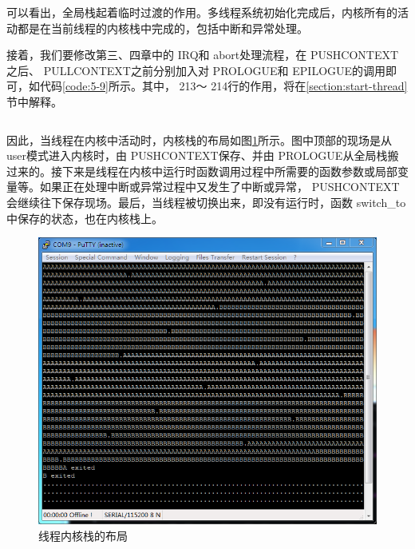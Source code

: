 \documentclass[main.tex]{subfiles}
\begin{document}
\begin{CJK*}{UTF8}{song}
\begin{code}
\label{code:5-8}
\inputminted[firstline=99,lastline=122,linenos,numbersep=5pt,frame=lines,framesep=2mm]{gas}{src/chapter05/kernel/entry.S}
\end{code}

\par
可以看出，全局栈起着临时过渡的作用。多线程系统初始化完成后，内核所有的活动都是在当前线程的内核栈中完成的，包括中断和异常处理。

\par
接着，我们要修改第三、四章中的 IRQ和 abort处理流程，在 PUSH\-CONTEXT之后、  PULL\-CONTEXT之前分别加入对 PRO\-LOGUE和 EPI\-LOGUE的调用即可，如代码\ref{code:5-9}所示。其中， 213～ 214行的作用，将在\ref{section:start-thread}节中解释。

\begin{code}
\label{code:5-9}
\inputminted[firstline=201,lastline=243,linenos,numbersep=5pt,frame=lines,framesep=2mm]{gas}{src/chapter05/kernel/entry.S}
\end{code}

因此，当线程在内核中活动时，内核栈的布局如图\ref{figure:5-2}所示。图中顶部的现场是从user模式进入内核时，由 PUSH\-CONTEXT保存、并由 PRO\-LOGUE从全局栈搬过来的。接下来是线程在内核中运行时函数调用过程中所需要的函数参数或局部变量等。如果正在处理中断或异常过程中又发生了中断或异常， PUSH\-CONTEXT会继续往下保存现场。最后，当线程被切换出来，即没有运行时，函数 switch\_\-to中保存的状态，也在内核栈上。

\begin{figure}[htp]
\centering
\includegraphics[scale=0.4]{figures/5-2}
\caption{线程内核栈的布局}
\label{figure:5-2}
\end{figure}


\end{CJK*}
\end{document}
